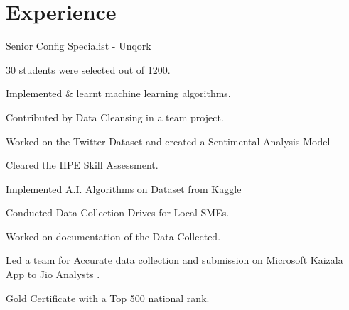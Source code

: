 \documentclass[]{deedy-resume-openfont}
\begin{document}
\hfill
\begin{minipage}[t]{0.66\textwidth} 


\section{Experience}
\vspace{\topsep}
\begin{tightemize}
\item Senior Config Specialist - Unqork
\end{tightemize}
\sectionsep

\vspace{\topsep} %
\begin{tightemize}
\item 30 students were selected out of 1200.
\item Implemented \& learnt machine learning algorithms. 
\item Contributed by Data Cleansing in a team project. 
\end{tightemize}
\sectionsep

\begin{tightemize}
\item Worked on the Twitter Dataset and created a Sentimental Analysis Model
\item Cleared the HPE Skill Assessment.
\item Implemented A.I. Algorithms on Dataset from Kaggle 
\end{tightemize}
\sectionsep

\begin{tightemize}
\item Conducted Data Collection Drives for Local SMEs. 
\item Worked on documentation of the Data Collected.
\item Led a team for Accurate data collection and submission on Microsoft Kaizala App to Jio Analysts .
\item Gold Certificate with a Top 500 national rank. 
\end{tightemize}
\sectionsep


\end{minipage}
\end{document}
